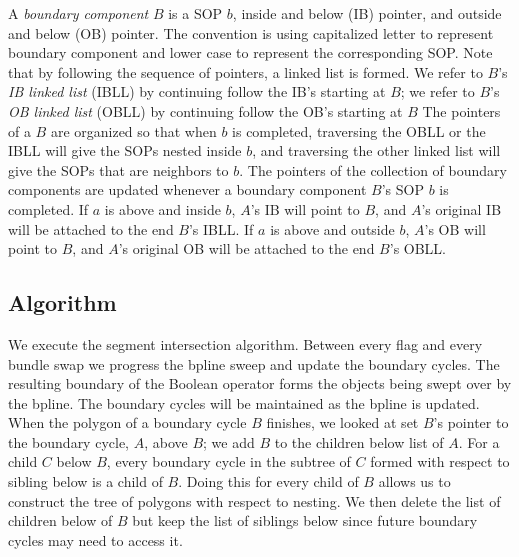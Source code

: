 \documentclass[11pt]{article}
\begin{document}
A \textit{boundary component} $B$ is a SOP $b$, inside and below (IB) pointer, and outside and below (OB) pointer.
The convention is using capitalized letter to represent boundary component and lower case to represent the corresponding SOP.
Note that by following the sequence of pointers, a linked list is formed.
We refer to $B$'s \textit{IB linked list} (IBLL) by continuing follow the IB's starting at $B$; we refer to $B$'s \textit{OB linked list} (OBLL) by continuing follow the OB's starting at $B$
The pointers of a $B$ are organized so that when $b$ is completed, traversing the OBLL or the IBLL will give the SOPs nested inside $b$, and traversing the other linked list will give the SOPs that are neighbors to $b$.
The pointers of the collection of boundary components are updated whenever a boundary component $B$'s SOP $b$ is completed.
If $a$ is above and inside $b$, $A$'s IB will point to $B$, and $A$'s original IB will be attached to the end $B$'s IBLL.
If $a$ is above and outside $b$, $A$'s OB will point to $B$, and $A$'s original OB will be attached to the end $B$'s OBLL.




\subsection{Algorithm}
We execute the segment intersection algorithm.
Between every flag and every bundle swap we progress the bpline sweep and update the boundary cycles.
The resulting boundary of the Boolean operator forms the objects being swept over by the bpline.
The boundary cycles will be maintained as the bpline is updated.
When the polygon of a boundary cycle $B$ finishes, we looked at set $B$'s pointer to the boundary cycle, $A$, above $B$; we add $B$ to the children below list of $A$.
For a child $C$ below $B$, every boundary cycle in the subtree of $C$ formed with respect to sibling below is a child of $B$.
Doing this for every child of $B$ allows us to construct the tree of polygons with respect to nesting.
We then delete the list of children below of $B$ but keep the list of siblings below since future boundary cycles may need to access it.
\end{document}
